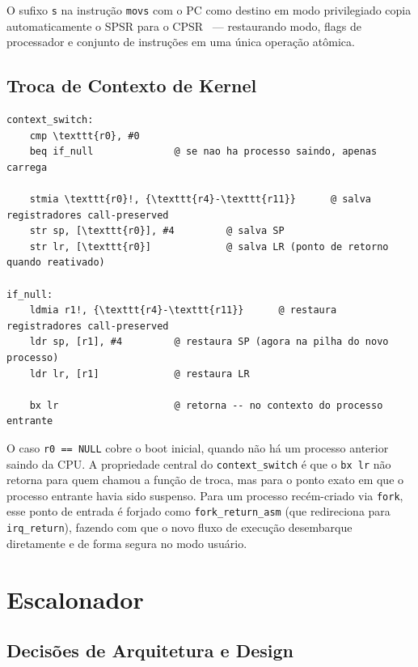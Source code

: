 O sufixo \texttt{s} na instrução \texttt{movs} com o PC como destino em 
modo privilegiado copia automaticamente o SPSR para o CPSR~\cite{arm:armv7ar} — 
restaurando modo, flags de processador e conjunto de instruções em uma única 
operação atômica.

\subsection{Troca de Contexto de Kernel}

\lstset{captionpos=t}
\begin{lstlisting}[language={[x86masm]Assembler},
                   caption={Troca de contexto de kernel em \texttt{context\_switch.S}}]
context_switch:
    cmp \texttt{r0}, #0
    beq if_null              @ se nao ha processo saindo, apenas carrega

    stmia \texttt{r0}!, {\texttt{r4}-\texttt{r11}}      @ salva registradores call-preserved
    str sp, [\texttt{r0}], #4         @ salva SP
    str lr, [\texttt{r0}]             @ salva LR (ponto de retorno quando reativado)

if_null:
    ldmia r1!, {\texttt{r4}-\texttt{r11}}      @ restaura registradores call-preserved
    ldr sp, [r1], #4         @ restaura SP (agora na pilha do novo processo)
    ldr lr, [r1]             @ restaura LR

    bx lr                    @ retorna -- no contexto do processo entrante
\end{lstlisting}
\lstset{captionpos=b}

O caso \texttt{\texttt{r0} == NULL} cobre o boot inicial, quando não há um 
processo anterior saindo da CPU. A propriedade central do \texttt{context\_switch} 
é que o \texttt{bx lr} não retorna para quem chamou a função de troca, mas para 
o ponto exato em que o processo entrante havia sido suspenso. Para um processo 
recém-criado via \texttt{fork}, esse ponto de entrada é forjado como 
\texttt{fork\_return\_asm} (que redireciona para \texttt{irq\_return}), 
fazendo com que o novo fluxo de execução desembarque diretamente e de 
forma segura no modo usuário.

\section{Escalonador}

\subsection{Decisões de Arquitetura e Design}

